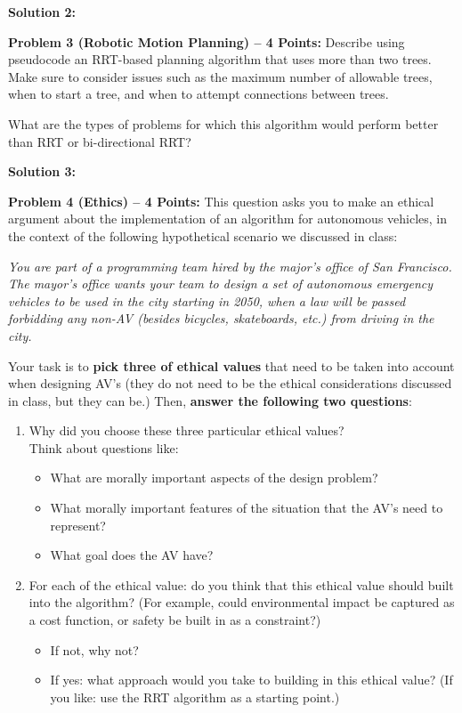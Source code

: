 \documentclass[]{article}
\begin{document}
\bigskip

\textbf{Solution 2:}

\clearpage

\textbf{Problem 3 (Robotic Motion Planning) -- 4 Points:}
Describe using pseudocode an RRT-based planning algorithm that uses more than two trees. Make sure to consider issues such as the maximum number of allowable trees, when to start a tree, and when to attempt connections between trees.

What are the types of problems for which this algorithm would perform better than RRT or bi-directional RRT?

\bigskip

\textbf{Solution 3:}

\clearpage

\textbf{Problem 4 (Ethics) -- 4 Points:}
This question asks you to make an ethical argument about the implementation of an algorithm for autonomous vehicles, in the context of the following hypothetical scenario we discussed in class:

\emph{You are part of a programming team hired by the major’s office of San Francisco. The mayor’s office wants your team to design a set of autonomous emergency vehicles to be used in the city starting in 2050, when a law will be passed forbidding any non-AV (besides bicycles, skateboards, etc.) from driving in the city.}

Your task is to \textbf{pick three of ethical values} that need to be taken into account when designing AV’s (they do not need to be the ethical considerations discussed in class, but they can be.) Then, \textbf{answer the following two questions}:
\begin{enumerate}
    \item Why did you choose these three particular ethical values? \\Think about questions like:
        \begin{itemize}
            \item What are morally important aspects of the design problem? 
            \item What morally important features of the situation that the AV’s need to represent? 
            \item What goal does the AV have?
        \end{itemize}
    \item For each of the ethical value: do you think that this ethical value should built into the algorithm? (For example, could environmental impact be captured as a cost function, or safety be built in as a constraint?)
    \begin{itemize}
        \item If not, why not?
        \item If yes: what approach would you take to building in this ethical value? (If you like: use the RRT algorithm as a starting point.)
    \end{itemize}
\end{enumerate}
\end{document}
